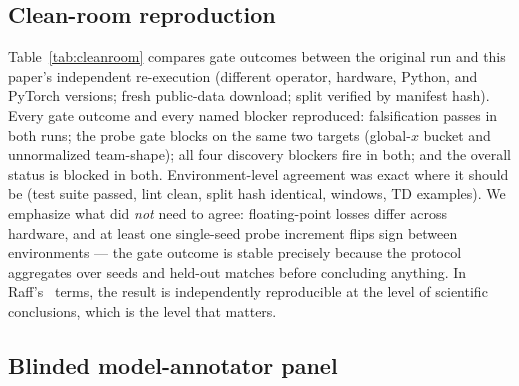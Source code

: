 \documentclass{article}
\begin{document}
\subsection{Clean-room reproduction}
\label{sec:cleanroom}



Table~\ref{tab:cleanroom} compares gate outcomes between the original run and
this paper's independent re-execution (different operator, hardware, Python,
and PyTorch versions; fresh public-data download; split verified by manifest
hash). Every gate outcome and every named blocker reproduced: falsification
passes in both runs; the probe gate blocks on the same two targets (global-$x$
bucket and unnormalized team-shape); all four discovery blockers fire in both;
and the overall status is blocked in both. Environment-level agreement was
exact where it should be (test suite \NumTestsPassed{} passed, lint clean,
split hash identical, \NumWindows{} windows, \NumTdExamples{} TD examples).
We emphasize what did \emph{not} need to agree: floating-point losses differ
across hardware, and at least one single-seed probe increment flips sign
between environments --- the gate outcome is stable precisely because the
protocol aggregates over seeds and held-out matches before concluding
anything. In Raff's~\citeyearpar{raff2019reproducibility} terms, the result is
independently reproducible at the level of scientific conclusions, which is
the level that matters.

\subsection{Blinded model-annotator panel}
\label{sec:panel}


\end{document}
